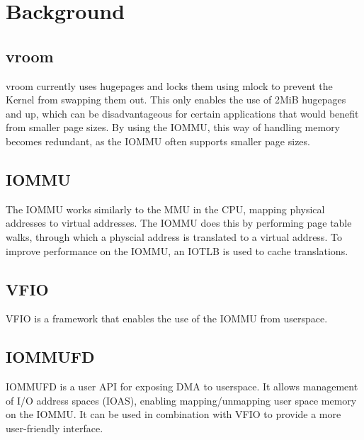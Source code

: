 \chapter{Background}

\section{vroom}
vroom currently uses hugepages and locks them using mlock to prevent the Kernel from swapping them out. This only enables the use of 2MiB hugepages and up, which can be disadvantageous for certain applications that would benefit from smaller page sizes.
By using the IOMMU, this way of handling memory becomes redundant, as the IOMMU often supports smaller page sizes.

\section{IOMMU}
The IOMMU works similarly to the MMU in the CPU, mapping physical addresses to virtual addresses.
The IOMMU does this by performing page table walks, through which a physcial address is translated to a virtual address.
To improve performance on the IOMMU, an IOTLB is used to cache translations.

\section{VFIO}
VFIO is a framework that enables the use of the IOMMU from userspace.

\section{IOMMUFD}
IOMMUFD is a user API for exposing DMA to userspace. It allows management of I/O address spaces (IOAS), enabling mapping/unmapping user space memory on the IOMMU.
It can be used in combination with VFIO to provide a more user-friendly interface.